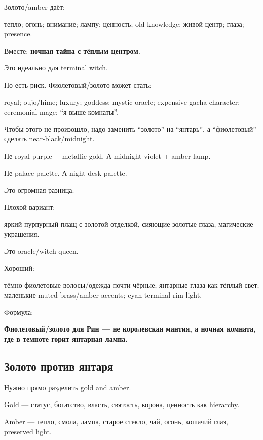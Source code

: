 Золото/\hspace{0pt}amber даёт:

тепло; огонь; внимание; лампу; ценность; old knowledge; живой центр;
глаза; presence.

Вместе: \textbf{ночная тайна с тёплым центром}.

Это идеально для terminal witch.

Но есть риск. Фиолетовый/\hspace{0pt}золото может стать:

royal; oujo/\hspace{0pt}hime; luxury; goddess; mystic oracle; expensive gacha
character; ceremonial mage; ``я выше комнаты''.

Чтобы этого не произошло, надо заменить ``золото'' на ``янтарь'', а
``фиолетовый'' сделать near-black/\hspace{0pt}midnight.

Не royal purple + metallic gold. А midnight violet + amber lamp.

Не palace palette. А night desk palette.

Это огромная разница.

Плохой вариант:

яркий пурпурный плащ с золотой отделкой, сияющие золотые глаза,
магические украшения.

Это oracle/\hspace{0pt}witch queen.

Хороший:

тёмно-фиолетовые волосы/\hspace{0pt}одежда почти чёрные; янтарные глаза как тёплый
свет; маленькие muted brass/\hspace{0pt}amber accents; cyan terminal rim light.

Формула:

\textbf{Фиолетовый/\hspace{0pt}золото для Рин --- не королевская мантия, а ночная
комната, где в темноте горит янтарная лампа.}

\subsection*{Золото против янтаря}

Нужно прямо разделить gold and amber.

Gold --- статус, богатство, власть, святость, корона, ценность как
hierarchy.

Amber --- тепло, смола, лампа, старое стекло, чай, огонь, кошачий глаз,
preserved light.

